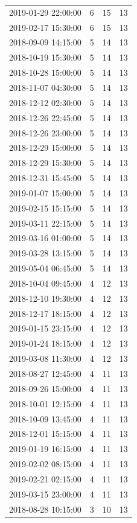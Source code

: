 \begin{tabular}{lrrr}
2019-01-29 22:00:00 & 6 & 15 & 13 \\
2019-02-17 15:30:00 & 6 & 15 & 13 \\
2018-09-09 14:15:00 & 5 & 14 & 13 \\
2018-10-19 15:30:00 & 5 & 14 & 13 \\
2018-10-28 15:00:00 & 5 & 14 & 13 \\
2018-11-07 04:30:00 & 5 & 14 & 13 \\
2018-12-12 02:30:00 & 5 & 14 & 13 \\
2018-12-26 22:45:00 & 5 & 14 & 13 \\
2018-12-26 23:00:00 & 5 & 14 & 13 \\
2018-12-29 15:00:00 & 5 & 14 & 13 \\
2018-12-29 15:30:00 & 5 & 14 & 13 \\
2018-12-31 15:45:00 & 5 & 14 & 13 \\
2019-01-07 15:00:00 & 5 & 14 & 13 \\
2019-02-15 15:15:00 & 5 & 14 & 13 \\
2019-03-11 22:15:00 & 5 & 14 & 13 \\
2019-03-16 01:00:00 & 5 & 14 & 13 \\
2019-03-28 13:15:00 & 5 & 14 & 13 \\
2019-05-04 06:45:00 & 5 & 14 & 13 \\
2018-10-04 09:45:00 & 4 & 12 & 13 \\
2018-12-10 19:30:00 & 4 & 12 & 13 \\
2018-12-17 18:15:00 & 4 & 12 & 13 \\
2019-01-15 23:15:00 & 4 & 12 & 13 \\
2019-01-24 18:15:00 & 4 & 12 & 13 \\
2019-03-08 11:30:00 & 4 & 12 & 13 \\
2018-08-27 12:45:00 & 4 & 11 & 13 \\
2018-09-26 15:00:00 & 4 & 11 & 13 \\
2018-10-01 12:15:00 & 4 & 11 & 13 \\
2018-10-09 13:45:00 & 4 & 11 & 13 \\
2018-12-01 15:15:00 & 4 & 11 & 13 \\
2019-01-19 16:15:00 & 4 & 11 & 13 \\
2019-02-02 08:15:00 & 4 & 11 & 13 \\
2019-02-21 02:15:00 & 4 & 11 & 13 \\
2019-03-15 23:00:00 & 4 & 11 & 13 \\
2018-08-28 10:15:00 & 3 & 10 & 13 \\

\end{tabular}
